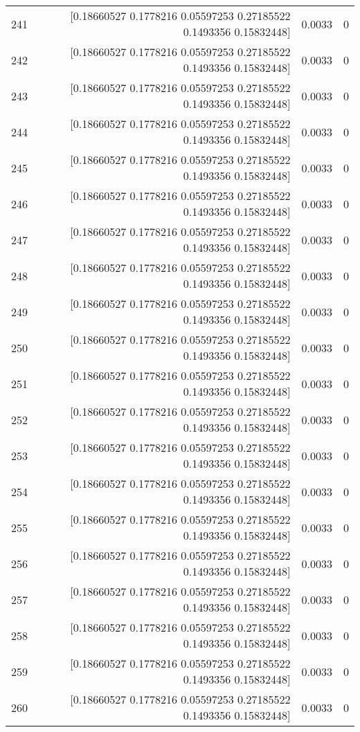 \begin{longtable}{lrrr}
241 & [0.18660527 0.1778216  0.05597253 0.27185522 0.1493356  0.15832448] & 0.0033 & 0 \\
242 & [0.18660527 0.1778216  0.05597253 0.27185522 0.1493356  0.15832448] & 0.0033 & 0 \\
243 & [0.18660527 0.1778216  0.05597253 0.27185522 0.1493356  0.15832448] & 0.0033 & 0 \\
244 & [0.18660527 0.1778216  0.05597253 0.27185522 0.1493356  0.15832448] & 0.0033 & 0 \\
245 & [0.18660527 0.1778216  0.05597253 0.27185522 0.1493356  0.15832448] & 0.0033 & 0 \\
246 & [0.18660527 0.1778216  0.05597253 0.27185522 0.1493356  0.15832448] & 0.0033 & 0 \\
247 & [0.18660527 0.1778216  0.05597253 0.27185522 0.1493356  0.15832448] & 0.0033 & 0 \\
248 & [0.18660527 0.1778216  0.05597253 0.27185522 0.1493356  0.15832448] & 0.0033 & 0 \\
249 & [0.18660527 0.1778216  0.05597253 0.27185522 0.1493356  0.15832448] & 0.0033 & 0 \\
250 & [0.18660527 0.1778216  0.05597253 0.27185522 0.1493356  0.15832448] & 0.0033 & 0 \\
251 & [0.18660527 0.1778216  0.05597253 0.27185522 0.1493356  0.15832448] & 0.0033 & 0 \\
252 & [0.18660527 0.1778216  0.05597253 0.27185522 0.1493356  0.15832448] & 0.0033 & 0 \\
253 & [0.18660527 0.1778216  0.05597253 0.27185522 0.1493356  0.15832448] & 0.0033 & 0 \\
254 & [0.18660527 0.1778216  0.05597253 0.27185522 0.1493356  0.15832448] & 0.0033 & 0 \\
255 & [0.18660527 0.1778216  0.05597253 0.27185522 0.1493356  0.15832448] & 0.0033 & 0 \\
256 & [0.18660527 0.1778216  0.05597253 0.27185522 0.1493356  0.15832448] & 0.0033 & 0 \\
257 & [0.18660527 0.1778216  0.05597253 0.27185522 0.1493356  0.15832448] & 0.0033 & 0 \\
258 & [0.18660527 0.1778216  0.05597253 0.27185522 0.1493356  0.15832448] & 0.0033 & 0 \\
259 & [0.18660527 0.1778216  0.05597253 0.27185522 0.1493356  0.15832448] & 0.0033 & 0 \\
260 & [0.18660527 0.1778216  0.05597253 0.27185522 0.1493356  0.15832448] & 0.0033 & 0 \\

\end{longtable}
